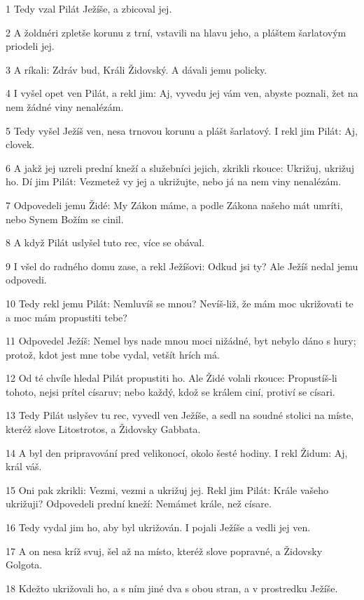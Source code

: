 \par 1 Tedy vzal Pilát Ježíše, a zbicoval jej.
\par 2 A žoldnéri zpletše korunu z trní, vstavili na hlavu jeho, a pláštem šarlatovým priodeli jej.
\par 3 A ríkali: Zdráv bud, Králi Židovský. A dávali jemu policky.
\par 4 I vyšel opet ven Pilát, a rekl jim: Aj, vyvedu jej vám ven, abyste poznali, žet na nem žádné viny nenalézám.
\par 5 Tedy vyšel Ježíš ven, nesa trnovou korunu a plášt šarlatový. I rekl jim Pilát: Aj, clovek.
\par 6 A jakž jej uzreli prední kneží a služebníci jejich, zkrikli rkouce: Ukrižuj, ukrižuj ho. Dí jim Pilát: Vezmetež vy jej a ukrižujte, nebo já na nem viny nenalézám.
\par 7 Odpovedeli jemu Židé: My Zákon máme, a podle Zákona našeho mát umríti, nebo Synem Božím se cinil.
\par 8 A když Pilát uslyšel tuto rec, více se obával.
\par 9 I všel do radného domu zase, a rekl Ježíšovi: Odkud jsi ty? Ale Ježíš nedal jemu odpovedi.
\par 10 Tedy rekl jemu Pilát: Nemluvíš se mnou? Nevíš-liž, že mám moc ukrižovati te a moc mám propustiti tebe?
\par 11 Odpovedel Ježíš: Nemel bys nade mnou moci nižádné, byt nebylo dáno s hury; protož, kdot jest mne tobe vydal, vetšít hrích má.
\par 12 Od té chvíle hledal Pilát propustiti ho. Ale Židé volali rkouce: Propustíš-li tohoto, nejsi prítel císaruv; nebo každý, kdož se králem ciní, protiví se císari.
\par 13 Tedy Pilát uslyšev tu rec, vyvedl ven Ježíše, a sedl na soudné stolici na míste, kteréž slove Litostrotos, a Židovsky Gabbata.
\par 14 A byl den pripravování pred velikonocí, okolo šesté hodiny. I rekl Židum: Aj, král váš.
\par 15 Oni pak zkrikli: Vezmi, vezmi a ukrižuj jej. Rekl jim Pilát: Krále vašeho ukrižuji? Odpovedeli prední kneží: Nemámet krále, než císare.
\par 16 Tedy vydal jim ho, aby byl ukrižován. I pojali Ježíše a vedli jej ven.
\par 17 A on nesa kríž svuj, šel až na místo, kteréž slove popravné, a Židovsky Golgota.
\par 18 Kdežto ukrižovali ho, a s ním jiné dva s obou stran, a v prostredku Ježíše.
